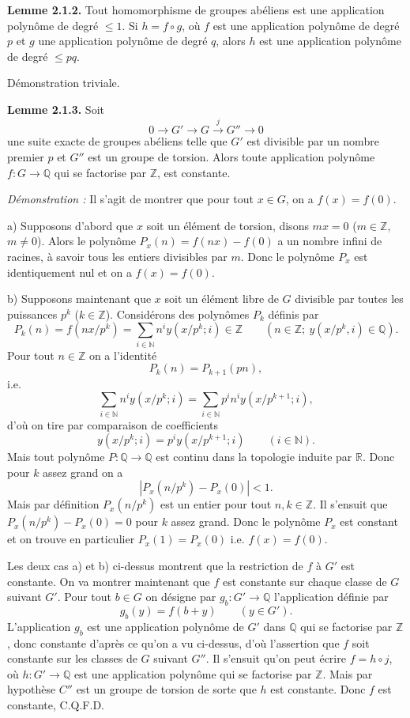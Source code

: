 \textbf{Lemme 2.1.2.} Tout homomorphisme de groupes abéliens est une application polynôme de degré $\leq1$. Si $h=f\circ g$, où $f$ est une application polynôme de degré $p$ et $g$ une application polynôme de degré $q$, alors $h$ est une application polynôme de degré $\leq pq$.

Démonstration triviale.

\textbf{Lemme 2.1.3.} Soit
\[
0\longrightarrow G'\longrightarrow G\xrightarrow{j}G''\longrightarrow0
\]
une suite exacte de groupes abéliens telle que $G'$ est divisible par un nombre premier $p$ et $G''$ est un groupe de torsion. Alors toute application polynôme $f:G\to\mathbb Q$ qui se factorise par $\mathbb Z$, est constante.

\emph{Démonstration :} Il s'agit de montrer que pour tout $x\in G$, on a $f(x)=f(0)$.

a) Supposons d'abord que $x$ soit un élément de torsion, disons $mx=0$ ($m\in\mathbb Z$, $m\ne0$). Alors le polynôme $P_x(n)=f(nx)-f(0)$ a un nombre infini de racines, à savoir tous les entiers divisibles par $m$. Donc le polynôme $P_x$ est identiquement nul et on a $f(x)=f(0)$.

b) Supposons maintenant que $x$ soit un élément libre de $G$ divisible par toutes les puissances $p^k$ ($k\in\mathbb Z$). Considérons des polynômes $P_k$ définis par
\[
P_k(n)=f(nx/p^k)=\sum_{i\in\mathbb N}n^iy(x/p^k;i)\in\mathbb Z
\qquad(n\in\mathbb Z;\ y(x/p^k,i)\in\mathbb Q).
\]
Pour tout $n\in\mathbb Z$ on a l'identité
\[
P_k(n)=P_{k+1}(pn),
\]
i.e.
\[
\sum_{i\in\mathbb N}n^iy(x/p^k;i)=\sum_{i\in\mathbb N}p^in^iy(x/p^{k+1};i),
\]
d'où on tire par comparaison de coefficients
\[
y(x/p^k;i)=p^iy(x/p^{k+1};i)\qquad(i\in\mathbb N).
\]
Mais tout polynôme $P:\mathbb Q\to\mathbb Q$ est continu dans la topologie induite par $\mathbb R$. Donc pour $k$ assez grand on a
\[
|P_x(n/p^k)-P_x(0)|<1.
\]
Mais par définition $P_x(n/p^k)$ est un entier pour tout $n,k\in\mathbb Z$. Il s'ensuit que $P_x(n/p^k)-P_x(0)=0$ pour $k$ assez grand. Donc le polynôme $P_x$ est constant et on trouve en particulier $P_x(1)=P_x(0)$ i.e. $f(x)=f(0)$.

Les deux cas a) et b) ci-dessus montrent que la restriction de $f$ à $G'$ est constante. On va montrer maintenant que $f$ est constante sur chaque classe de $G$ suivant $G'$. Pour tout $b\in G$ on désigne par $g_b:G'\to\mathbb Q$ l'application définie par
\[
g_b(y)=f(b+y)\qquad(y\in G').
\]
L'application $g_b$ est une application polynôme de $G'$ dans $\mathbb Q$ qui se factorise par $\mathbb Z$, donc constante d'après ce qu'on a vu ci-dessus, d'où l'assertion que $f$ soit constante sur les classes de $G$ suivant $G''$. Il s'ensuit qu'on peut écrire $f=h\circ j$, où $h:G'\to\mathbb Q$ est une application polynôme qui se factorise par $\mathbb Z$. Mais par hypothèse $C''$ est un groupe de torsion de sorte que $h$ est constante. Donc $f$ est constante, C.Q.F.D.

